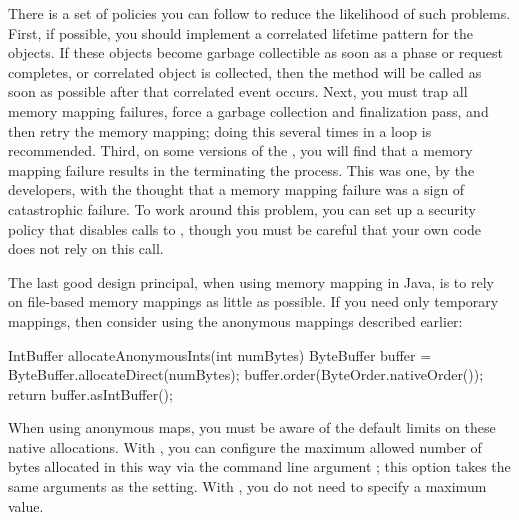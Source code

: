 There is a set of policies you can follow to reduce the likelihood of such
problems. First, if possible, you should implement a correlated lifetime pattern
for the  objects. If these objects become garbage collectible
as soon as a phase or request completes, or correlated object is collected, then
the  method will be called as soon as possible after
that correlated event occurs. Next, you must trap all memory mapping failures,
force a garbage collection and finalization pass, and then retry the memory
mapping; doing this several times in a loop is recommended. Third, on some
versions of the \jre, you will find that a memory mapping failure results in the
\jre terminating the process. This was one, by the \jre developers, with the
thought that a memory mapping failure was a sign of catastrophic failure.
To work around this problem, you can set up a security policy that disables
calls to , though you must be careful that your own code does
not rely on this call.

The last good design principal, when using memory mapping in Java, is to rely on
file-based memory mappings as little as possible. If you need only temporary
mappings, then consider using the anonymous mappings described earlier:
\begin{shortlisting}
IntBuffer allocateAnonymousInts(int numBytes) {
   ByteBuffer buffer = ByteBuffer.allocateDirect(numBytes);
   buffer.order(ByteOrder.nativeOrder());
   return buffer.asIntBuffer();
}
\end{shortlisting}
When using anonymous maps, you must be aware of the default limits on these
native allocations. With \oracle \jres, you can configure the maximum allowed number
of bytes allocated in this way via the command line argument
; this option takes the same arguments as the
 setting. With \ibm \jres, you do not need to specify a maximum value.


